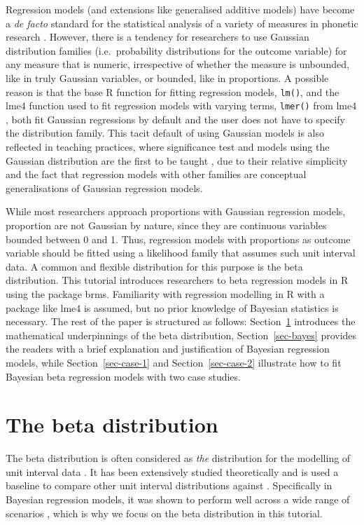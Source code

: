 \documentclass[
  authoryear,
  preprint,
  3p]{elsarticle}
\begin{document}
Regression models (and extensions like generalised additive models) have
become a \emph{de facto} standard for the statistical analysis of a
variety of measures in phonetic research
\citep{kirby2018, politzerahles2018, tavakoli2024}. However, there is a
tendency for researchers to use Gaussian distribution families
(i.e.~probability distributions for the outcome variable) for any
measure that is numeric, irrespective of whether the measure is
unbounded, like in truly Gaussian variables, or bounded, like in
proportions. A possible reason is that the base R function for fitting
regression models, \texttt{lm()}, and the lme4 function used to fit
regression models with varying terms, \texttt{lmer()} from lme4
\citep{bates2015}, both fit Gaussian regressions by default and the user
does not have to specify the distribution family. This tacit default of
using Gaussian models is also reflected in teaching practices, where
significance test and models using the Gaussian distribution are the
first to be taught \citep{baayen2008, winter2020}, due to their relative
simplicity and the fact that regression models with other families are
conceptual generalisations of Gaussian regression models.

While most researchers approach proportions with Gaussian regression
models, proportion are not Gaussian by nature, since they are continuous
variables bounded between 0 and 1. Thus, regression models with
proportions as outcome variable should be fitted using a likelihood
family that assumes such unit interval data. A common and flexible
distribution for this purpose is the beta distribution. This tutorial
introduces researchers to beta regression models in R using the package
brms. Familiarity with regression modelling in R with a package like
lme4 is assumed, but no prior knowledge of Bayesian statistics is
necessary. The rest of the paper is structured as follows:
Section~\ref{sec-beta} introduces the mathematical underpinnings of the
beta distribution, Section~\ref{sec-bayes} provides the readers with a
brief explanation and justification of Bayesian regression models, while
Section~\ref{sec-case-1} and Section~\ref{sec-case-2} illustrate how to
fit Bayesian beta regression models with two case studies.

\section{The beta distribution}\label{sec-beta}

The beta distribution is often considered as \emph{the} distribution for
the modelling of unit interval data
\citep{ferrari_beta_2004, cribari-neto_beta_2010}. It has been
extensively studied theoretically
\citep{krysicki_new_1999, gupta_handbook_2014, espinheira_beta_2008} and
is used a baseline to compare other unit interval distributions against
\citep{kieschnick_regression_2003, bonat_regression_2013, lopez_bayesian_2013}.
Specifically in Bayesian regression models, it was shown to perform well
across a wide range of scenarios
\citep{scholz_posterior_2023, scholz_prediction_2025}, which is why we
focus on the beta distribution in this tutorial.
\end{document}
